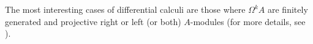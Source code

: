 \documentclass{amsart}
\newtheorem{proposition}[theorem]{Proposition}
\theoremstyle{definition}
\theoremstyle{remark}
\numberwithin{equation}{section}
\begin{document}




The most interesting cases of differential calculi are those where $\Omega^k A$ are finitely generated and projective right or left (or both) $A$-modules (for more details, see \cite{Brzezinski2011}).
\end{document}
